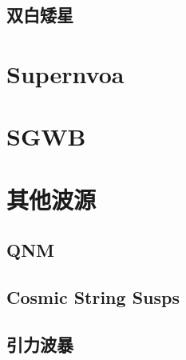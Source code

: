 \subsection{双白矮星}
\section{Supernvoa}
\section{SGWB}
\section{其他波源}
\subsection{QNM}
\subsection{Cosmic String Susps}
\subsection{引力波暴}

